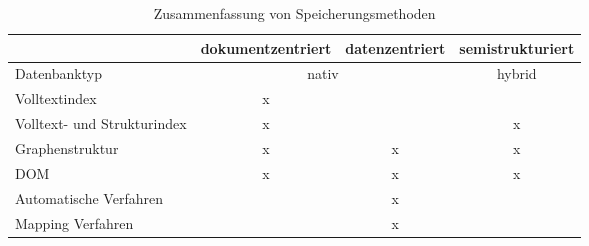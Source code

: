 \begin{table}
	\sffamily
	\centering
		\begin{tabularx}{\textwidth}{|X|l|l|l|}
				\cline{2-4}
				\multicolumn{1}{l|}{} & dokumentzentriert & datenzentriert & semistrukturiert \\ 
				\hline
				Datenbanktyp & \multicolumn{2}{c|}{nativ} & \multicolumn{1}{c|}{hybrid} \\ 
				\hline
				Volltextindex & \multicolumn{1}{c|}{x} & \multicolumn{1}{c|}{} & \multicolumn{1}{c|}{} \\ 
				\hline
				Volltext- und Strukturindex & \multicolumn{1}{c|}{x} & \multicolumn{1}{c|}{} & \multicolumn{1}{c|}{x} \\ 
				\hline
				Graphenstruktur & \multicolumn{1}{c|}{x} & \multicolumn{1}{c|}{x} & \multicolumn{1}{c|}{x} \\ 
				\hline
				DOM & \multicolumn{1}{c|}{x} & \multicolumn{1}{c|}{x} & \multicolumn{1}{c|}{x} \\ 
				\hline
				Automatische Verfahren & \multicolumn{1}{c|}{} & \multicolumn{1}{c|}{x} & \multicolumn{1}{c|}{} \\ 
				\hline
				Mapping Verfahren & \multicolumn{1}{c|}{} & \multicolumn{1}{c|}{x} & \multicolumn{1}{c|}{} \\ 
				\hline
			\end{tabularx}
	\caption{Zusammenfassung von Speicherungsmethoden}
	\label{tab:xml-zusammenfassung-nativ-speicherung}
\end{table}
